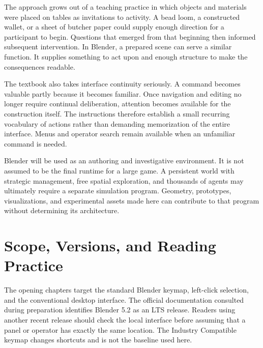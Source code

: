 \documentclass[11pt,openany]{book}
\begin{document}
The approach grows out of a teaching practice in which objects and materials were placed on tables as invitations to activity. A bead loom, a constructed wallet, or a sheet of butcher paper could supply enough direction for a participant to begin. Questions that emerged from that beginning then informed subsequent intervention. In Blender, a prepared scene can serve a similar function. It supplies something to act upon and enough structure to make the consequences readable.

The textbook also takes interface continuity seriously. A command becomes valuable partly because it becomes familiar. Once navigation and editing no longer require continual deliberation, attention becomes available for the construction itself. The instructions therefore establish a small recurring vocabulary of actions rather than demanding memorization of the entire interface. Menus and operator search remain available when an unfamiliar command is needed.

Blender will be used as an authoring and investigative environment. It is not assumed to be the final runtime for a large game. A persistent world with strategic management, free spatial exploration, and thousands of agents may ultimately require a separate simulation program. Geometry, prototypes, visualizations, and experimental assets made here can contribute to that program without determining its architecture.

\chapter*{Scope, Versions, and Reading Practice}

The opening chapters target the standard Blender keymap, left-click selection, and the conventional desktop interface. The official documentation consulted during preparation identifies Blender 5.2 as an LTS release. Readers using another recent release should check the local interface before assuming that a panel or operator has exactly the same location. The Industry Compatible keymap changes shortcuts and is not the baseline used here.
\end{document}
